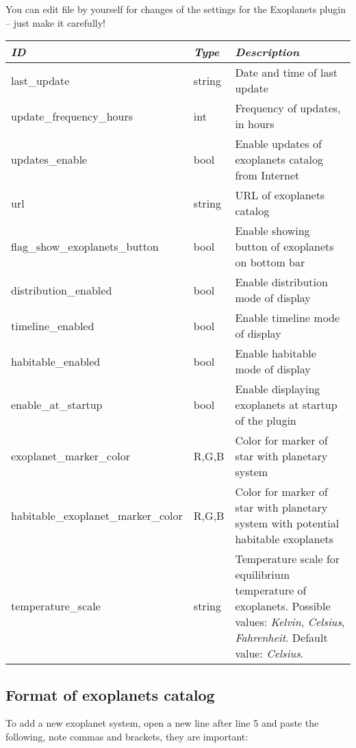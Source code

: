 You can edit  file by yourself for changes of the
settings for the Exoplanets plugin -- just make it carefully!

\noindent%
\begin{tabularx}{\textwidth}{l|l|X}\toprule
\emph{ID}               & \emph{Type} & \emph{Description}\\\midrule
last\_update                 & string & Date and time of last update \\%
update\_frequency\_hours       & int  & Frequency of updates, in hours \\%
updates\_enable                & bool & Enable updates of exoplanets catalog from Internet \\%
url                          & string & URL of exoplanets catalog \\%
flag\_show\_exoplanets\_button & bool & Enable showing button of exoplanets on bottom bar \\%
distribution\_enabled          & bool & Enable distribution mode of display \\%
timeline\_enabled              & bool & Enable timeline mode of display \\%
habitable\_enabled             & bool & Enable habitable mode of display \\%
enable\_at\_startup            & bool & Enable displaying exoplanets at startup of the plugin \\%
exoplanet\_marker\_color      & R,G,B & Color for marker of star with planetary system \\%
habitable\_exoplanet\_marker\_color & R,G,B & Color for marker of star with planetary system with potential habitable exoplanets\\%
temperature\_scale           & string & Temperature scale for equilibrium temperature of exoplanets. 
                                        Possible values: \emph{Kelvin}, \emph{Celsius}, \emph{Fahrenheit}. Default value: \emph{Celsius}. \\\bottomrule
\end{tabularx}

\newpage
\subsection{Format of exoplanets catalog}
\label{sec:plugins:Exoplanets:format}

To add a new exoplanet system, open a new line after line 5 and paste the following, note commas and brackets, they are important:

